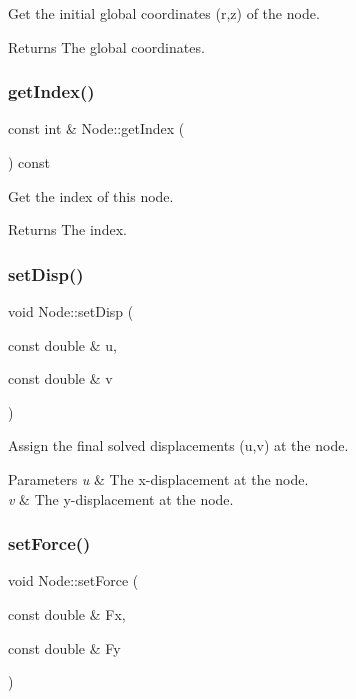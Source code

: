 Get the initial global coordinates (r,z) of the node. 

\begin{DoxyReturn}{Returns}
The global coordinates. 
\end{DoxyReturn}
\mbox{\label{class_node_a8266479b3d82c502d7b4abc5afccb8c0}} 
\subsubsection{\texorpdfstring{get\+Index()}{getIndex()}}
{\footnotesize\ttfamily const int \& Node\+::get\+Index (\begin{DoxyParamCaption}{ }\end{DoxyParamCaption}) const}



Get the index of this node. 

\begin{DoxyReturn}{Returns}
The index. 
\end{DoxyReturn}
\mbox{\label{class_node_a9703bb2540dbc410edd3a168a6c51cd6}} 
\subsubsection{\texorpdfstring{set\+Disp()}{setDisp()}}
{\footnotesize\ttfamily void Node\+::set\+Disp (\begin{DoxyParamCaption}\item[{const double \&}]{u,  }\item[{const double \&}]{v }\end{DoxyParamCaption})}



Assign the final solved displacements (u,v) at the node. 


\begin{DoxyParams}{Parameters}
{\em u} & The x-\/displacement at the node. \\
\hline
{\em v} & The y-\/displacement at the node. \\
\hline
\end{DoxyParams}
\mbox{\label{class_node_a261921c1143a8dfb7f7f7f454ce827e3}} 
\subsubsection{\texorpdfstring{set\+Force()}{setForce()}}
{\footnotesize\ttfamily void Node\+::set\+Force (\begin{DoxyParamCaption}\item[{const double \&}]{Fx,  }\item[{const double \&}]{Fy }\end{DoxyParamCaption})}



